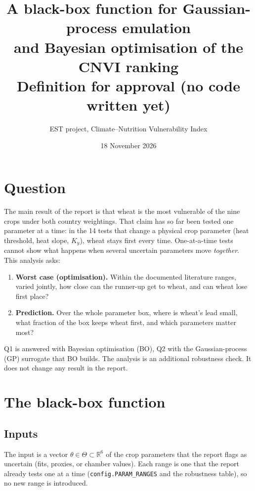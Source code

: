 \documentclass[11pt,a4paper]{article}
\title{A black-box function for Gaussian-process emulation\\and Bayesian optimisation of the CNVI ranking\\[4pt]
\large Definition for approval (no code written yet)}
\author{EST project, Climate--Nutrition Vulnerability Index}
\date{18 November 2026}
\numberwithin{equation}{section}
\newcommand{\R}{\mathbb{R}}
\begin{document}
\maketitle
\tableofcontents

\section{Question}
The main result of the report is that wheat is the most vulnerable of the nine crops under both country
weightings. That claim has so far been tested one parameter at a time: in the 14 tests that change a physical
crop parameter (heat threshold, heat slope, $K_y$), wheat stays first every time. One-at-a-time tests cannot show
what happens when several uncertain parameters move \emph{together}. This analysis asks:
\begin{enumerate}[label=\textbf{Q\arabic*.}]
\item \textbf{Worst case (optimisation).} Within the documented literature ranges, varied jointly, how close can
the runner-up get to wheat, and can wheat lose first place?
\item \textbf{Prediction.} Over the whole parameter box, where is wheat's lead small, what fraction of the box keeps
wheat first, and which parameters matter most?
\end{enumerate}
Q1 is answered with Bayesian optimisation (BO), Q2 with the Gaussian-process (GP) surrogate that BO builds.
The analysis is an additional robustness check. It does not change any result in the report.

\section{The black-box function}\label{sec:bb}

\subsection{Inputs}
The input is a vector $\theta\in\Theta\subset\R^6$ of the crop parameters that the report flags as uncertain
(fits, proxies, or chamber values). Each range is one that the report already tests one at a time
(\texttt{config.PARAM\_RANGES} and the robustness table), so no new range is introduced.
\end{document}
